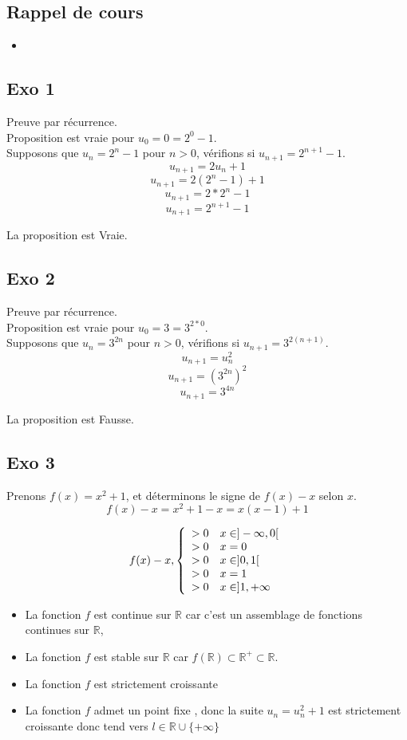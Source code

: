 \documentclass[]{book}
\theoremstyle{definition}
\newcommand{\bb}[1]{\mathbb{#1}}
\newcommand{\R}{\bb{R}}
\begin{document}
\subsection*{Rappel de cours}

\begin{itemize}
\item 
\end{itemize}

\subsection*{Exo 1}
Preuve par r\'ecurrence.\\
Proposition est vraie pour $u_0 = 0 = 2^0 -1$.\\
Supposons que $u_n = 2^n-1$ pour $n>0$, v\'erifions si $u_{n+1} = 2^{n+1} - 1$.
$$u_{n+1} = 2u_n + 1$$
$$u_{n+1} = 2(2^n - 1) + 1$$
$$u_{n+1} = 2*2^n - 1$$
$$u_{n+1} = 2^{n+1} - 1$$

La proposition est Vraie.

\subsection*{Exo 2}
Preuve par r\'ecurrence.\\
Proposition est vraie pour $u_0 = 3 = 3^{2*0}$.\\
Supposons que $u_n = 3^{2n}$ pour $n>0$, v\'erifions si $u_{n+1} = 3^{2(n+1)}$.
$$u_{n+1} = u_n^2$$
$$u_{n+1} = (3^{2n})^2$$
$$u_{n+1} = 3^{4n}$$

La proposition est Fausse.

\subsection*{Exo 3}
Prenons $f(x) = x^2 + 1$, et d\'eterminons le signe de $f(x) - x$ selon $x$.\\
$$f(x) - x = x^2 + 1 -x = x(x-1) + 1$$

$$f(x) - x,
\left\{ 
\begin{array}{l l}
 >0 & x \in ]-\infty,0[\\
 >0 & x = 0\\
 >0 & x \in ]0,1[ \\
 >0 & x = 1\\
 >0 & x \in ]1,+\infty \\ 
\end{array}
\right. 
$$

\begin{itemize} 
\item La fonction $f$ est continue sur $\R$ car c'est un assemblage de fonctions continues sur $\R$,
\item La fonction $f$ est stable sur $\R$ car $f(\R) \subset \R^+ \subset \R$.
\item La fonction $f$ est strictement croissante
\item La fonction $f$ admet un point fixe , donc la suite $u_n = u_n^2 + 1$ est strictement croissante donc tend vers $l \in \R \cup \{+\infty\}$
\end{itemize} 
\end{document}
